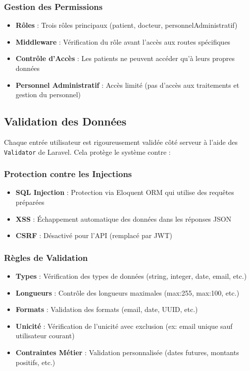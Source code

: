 \documentclass[12pt,a4paper]{report}
\begin{document}
\subsubsection{Gestion des Permissions}

\begin{itemize}
    \item \textbf{Rôles} : Trois rôles principaux (patient, docteur, personnelAdministratif)
    \item \textbf{Middleware} : Vérification du rôle avant l'accès aux routes spécifiques
    \item \textbf{Contrôle d'Accès} : Les patients ne peuvent accéder qu'à leurs propres données
    \item \textbf{Personnel Administratif} : Accès limité (pas d'accès aux traitements et gestion du personnel)
\end{itemize}

\subsection{Validation des Données}

Chaque entrée utilisateur est rigoureusement validée côté serveur à l'aide des \texttt{Validator} de Laravel. Cela protège le système contre :

\subsubsection{Protection contre les Injections}

\begin{itemize}
    \item \textbf{SQL Injection} : Protection via Eloquent ORM qui utilise des requêtes préparées
    \item \textbf{XSS} : Échappement automatique des données dans les réponses JSON
    \item \textbf{CSRF} : Désactivé pour l'API (remplacé par JWT)
\end{itemize}

\subsubsection{Règles de Validation}

\begin{itemize}
    \item \textbf{Types} : Vérification des types de données (string, integer, date, email, etc.)
    \item \textbf{Longueurs} : Contrôle des longueurs maximales (max:255, max:100, etc.)
    \item \textbf{Formats} : Validation des formats (email, date, UUID, etc.)
    \item \textbf{Unicité} : Vérification de l'unicité avec exclusion (ex: email unique sauf utilisateur courant)
    \item \textbf{Contraintes Métier} : Validation personnalisée (dates futures, montants positifs, etc.)
\end{itemize}
\end{document}
